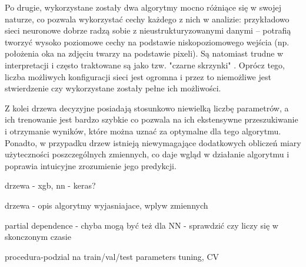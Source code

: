 Po drugie, wykorzystane zostały dwa algorytmy mocno różniące się w swojej naturze, co pozwala wykorzystać cechy każdego z nich w analizie: przykładowo sieci neuronowe dobrze radzą sobie z nieustrukturyzowanymi danymi -- potrafią tworzyć wysoko poziomowe cechy na podstawie niskopoziomowego wejścia (np. położenia oka na zdjęciu twarzy na podstawie pixeli). Są natomiast trudne w interpretacji i często traktowane są jako tzw. "czarne skrzynki" . Oprócz tego, liczba możliwych konfiguracji sieci jest ogromna i przez to niemożliwe jest stwierdzenie czy wykorzystane zostały pełne ich możliwości.

Z kolei drzewa decyzyjne posiadają stosunkowo niewielką liczbę parametrów, a ich trenowanie jest bardzo szybkie co pozwala na ich ekstensywne przeszukiwanie i otrzymanie wyników, które można uznać za optymalne dla tego algorytmu.
Ponadto, w przypadku drzew istnieją niewymagające dodatkowych obliczeń miary użyteczności poszczególnych zmiennych, co daje wgląd w działanie algorytmu i poprawia intuicyjne zrozumienie jego predykcji.

\vspace{5em}

drzewa - xgb, nn - keras?

drzewa - opis algorytmy wyjasniajace, wplyw zmiennych

partial dependence - chyba mogą być też dla NN - sprawdzić czy liczy się w skonczonym czasie



procedura-podzial na train/val/test
parameters tuning, CV




